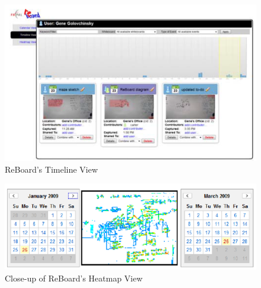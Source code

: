 \documentclass{article}
\begin{document}
\begin{figure}[H]
\centering
\includegraphics[scale=0.7]{images/research_reboard_2}
\caption{ReBoard's Timeline View}
\label{fig:research_reboard_2}
\end{figure}

\begin{figure}[H]
\centering
\includegraphics[scale=0.7]{images/research_reboard_3}
\caption{Close-up of ReBoard's Heatmap View}
\label{fig:research_reboard_3}
\end{figure}
\end{document}
